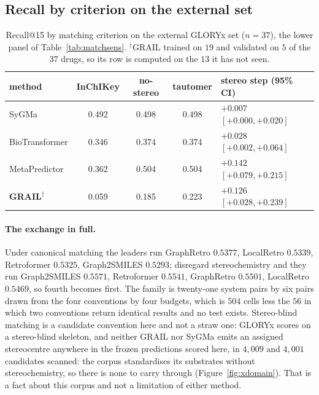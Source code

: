 \subsection{Recall by criterion on the external set}
\label{app:matchsensext}

\begin{table}[h]
\caption{Recall@15 by matching criterion on the external GLORYx set ($n=37$), the lower panel of
Table~\ref{tab:matchsens}. $^\dagger$GRAIL trained on $19$ and validated on $5$ of the $37$ drugs,
so its row is computed on the $13$ it has not seen.}
\label{tab:matchsensext}
\centering
\begin{tabular}{lccc l}
\toprule
\textbf{method} & InChIKey & no-stereo & tautomer & stereo step (95\% CI) \\
\midrule
SyGMa          & 0.492 & 0.498 & 0.498 & $+0.007$ $[+0.000,+0.020]$ \\
BioTransformer & 0.346 & 0.374 & 0.374 & $+0.028$ $[+0.002,+0.064]$ \\
MetaPredictor  & 0.362 & 0.504 & 0.504 & $+0.142$ $[+0.079,+0.215]$ \\
\textbf{GRAIL}$^\dagger$ & 0.059 & 0.185 & 0.223 & $+0.126$ $[+0.028,+0.239]$ \\
\bottomrule
\end{tabular}
\end{table}

\paragraph{The exchange in full.} Under canonical matching the leaders run GraphRetro $0.5377$,
LocalRetro $0.5339$, Retroformer $0.5325$, Graph2SMILES $0.5293$; disregard stereochemistry and they
run Graph2SMILES $0.5571$, Retroformer $0.5541$, GraphRetro $0.5501$, LocalRetro $0.5469$, so fourth
becomes first. The family is twenty-one system pairs by six pairs drawn from the four conventions by
four budgets, which is $504$ cells less the $56$ in which two conventions return identical results
and no test exists. Stereo-blind matching is a candidate convention here and not a straw one: GLORYx
scores on a stereo-blind skeleton, and neither GRAIL nor SyGMa emits an assigned stereocentre
anywhere in the frozen predictions scored here, in $4{,}009$ and $4{,}001$ candidates scanned: the
corpus standardises its substrates without stereochemistry, so there is none to carry through
(Figure~\ref{fig:xdomain}). That is a fact about this corpus and not a limitation of either method.

